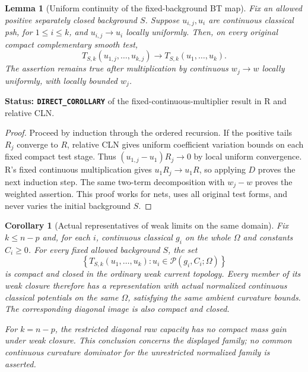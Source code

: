 \documentclass[11pt,a4paper]{article}
\numberwithin{equation}{section}
\newtheorem{lemma}[theorem]{Lemma}
\newtheorem{corollary}[theorem]{Corollary}
\theoremstyle{definition}
\theoremstyle{remark}
\begin{document}
\begin{lemma}[Uniform continuity of the fixed-background BT map]
\label{lem:r6-uniform-bt-map}
Fix an allowed positive separately closed background $S$. Suppose
$u_{i,j},u_i$ are continuous classical psh, for $1\leq i\leq k$,
and $u_{i,j}\to u_i$ locally uniformly. Then, on every original
compact complementary smooth test,
\[
 T_{S,k}(u_{1,j},\ldots,u_{k,j})
                  \longrightarrow T_{S,k}(u_1,\ldots,u_k).
\]
The assertion remains true after multiplication by continuous
$w_j\to w$ locally uniformly, with locally bounded $w_j$.
\end{lemma}

\noindent\textbf{Status: \texttt{DIRECT\_COROLLARY}} of the
fixed-continuous-multiplier result in R and relative CLN.

\begin{proof}
Proceed by induction through the ordered recursion. If the positive
tails $R_j$ converge to $R$, relative CLN gives uniform coefficient
variation bounds on each fixed compact test stage. Thus
$(u_{1,j}-u_1)R_j\to0$ by local uniform convergence. R's fixed
continuous multiplication gives $u_1R_j\to u_1R$, so applying $D$
proves the next induction step. The same two-term decomposition
with $w_j-w$ proves the weighted assertion. This proof works for
nets, uses all original test forms, and never varies the initial
background $S$.
\end{proof}

\begin{corollary}[Actual representatives of weak limits on the same domain]
\label{cor:r6-dominated-family-actual-weak-closure}
Fix $k\leq n-p$ and, for each $i$, continuous classical $g_i$ on
the whole $\Omega$ and constants $C_i\geq0$. For every fixed
allowed background $S$, the set
\[
 \left\{T_{S,k}(u_1,\ldots,u_k):
               u_i\in\mathscr P(g_i,C_i;\Omega)\right\}
\]
is compact and closed in the ordinary weak current topology.
Every member of its weak closure therefore has a representation
with actual normalized continuous classical potentials on the
same $\Omega$, satisfying the same ambient curvature bounds.
The corresponding diagonal image is also compact and closed.

For $k=n-p$, the restricted diagonal raw capacity has no compact
mass gain under weak closure. This conclusion concerns the displayed
family; no common continuous curvature dominator for the unrestricted
normalized family is asserted.
\end{corollary}
\end{document}
